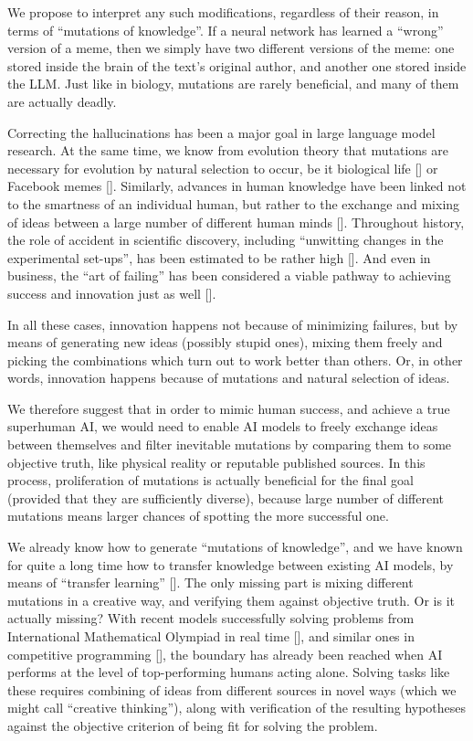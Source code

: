 \documentclass[12pt]{article}
\newcommand{\citestrut}[1]{\vphantom{[}{#1}\vphantom{]}}
\renewcommand{\cite}[1]{[\hyperlink{#1}{\citestrut{#1}}]}
\begin{document}
We propose to interpret any such modifications, regardless of their reason, in terms of
``mutations of knowledge''. If a neural network has learned a ``wrong'' version of a
meme, then we simply have two different versions of the meme: one stored inside the brain
of the text's original author, and another one stored inside the LLM. Just like in
biology, mutations are rarely beneficial, and many of them are actually deadly.

Correcting the hallucinations has been a major goal in large language model research. At
the same time, we know from evolution theory that mutations are necessary for evolution
by natural selection to occur, be it biological life \cite{SelfishGene} or Facebook memes
\cite{FacebookMemes}. Similarly, advances in human knowledge have been linked not to the
smartness of an individual human, but rather to the exchange and mixing of ideas between
a large number of different human minds \cite{CollectiveIntelligence}. Throughout
history, the role of accident in scientific discovery, including ``unwitting changes in
the experimental set-ups'', has been estimated to be rather high \cite{Serendipity}. And
even in business, the ``art of failing'' has been considered a viable pathway to
achieving success and innovation just as well \cite{IntelligentFailure}.

In all these cases, innovation happens not because of minimizing failures, but by means
of generating new ideas (possibly stupid ones), mixing them freely and picking the
combinations which turn out to work better than others. Or, in other words, innovation
happens because of mutations and natural selection of ideas.

We therefore suggest that in order to mimic human success, and achieve a true superhuman
AI, we would need to enable AI models to freely exchange ideas between themselves and
filter inevitable mutations by comparing them to some objective truth, like physical
reality or reputable published sources. In this process, proliferation of mutations is
actually beneficial for the final goal (provided that they are sufficiently diverse),
because large number of different mutations means larger chances of spotting the more
successful one.

We already know how to generate ``mutations of knowledge'', and we have known for quite a
long time how to transfer knowledge between existing AI models, by means of ``transfer
learning'' \cite{TransferLearning}. The only missing part is mixing different mutations
in a creative way, and verifying them against objective truth. Or is it actually missing?
With recent models successfully solving problems from International Mathematical Olympiad
in real time \cite{IMO}, and similar ones in competitive programming \cite{ICPC}, the
boundary has already been reached when AI performs at the level of top-performing humans
acting alone. Solving tasks like these requires combining of ideas from different sources
in novel ways (which we might call ``creative thinking''), along with verification of the
resulting hypotheses against the objective criterion of being fit for solving the
problem.
\end{document}
